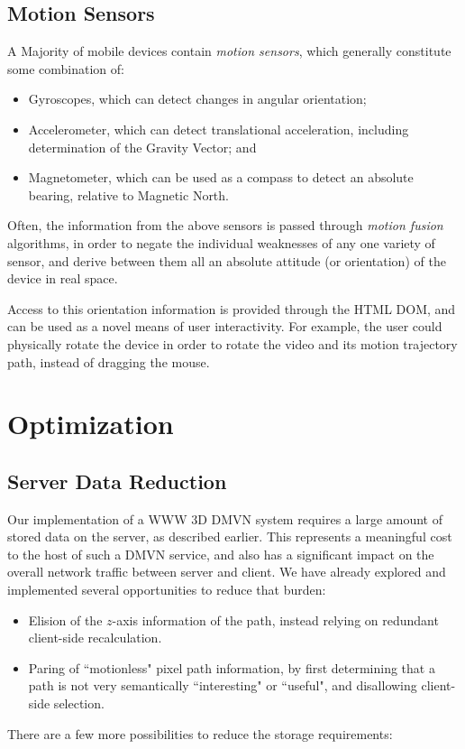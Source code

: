 \subsection{Motion Sensors}
A Majority of mobile devices contain \emph{motion sensors}, which generally constitute some combination of:
    \begin{itemize}
    \item Gyroscopes, which can detect changes in angular orientation;
    \item Accelerometer, which can detect translational acceleration, including determination of the Gravity Vector; and
    \item Magnetometer, which can be used as a compass to detect an absolute bearing, relative to Magnetic North.
    \end{itemize}
    Often, the information from the above sensors is passed through \emph{motion fusion} algorithms, in order to negate the individual weaknesses of any one variety of sensor, and derive between them all an absolute attitude (or orientation) of the device in real space.\par
    Access to this orientation information is provided through the HTML DOM, and can be used as a novel means of user interactivity. For example, the user could physically rotate the device in order to rotate the video and its motion trajectory path, instead of dragging the mouse.



\section{Optimization}

\subsection{Server Data Reduction}
    Our implementation of a WWW 3D DMVN system requires a large amount of stored data on the server, as described earlier. This represents a meaningful cost to the host of such a DMVN service, and also has a significant impact on the overall network traffic between server and client. We have already explored and implemented several opportunities to reduce that burden:
\begin {itemize}
    \item Elision of the $z$-axis information of the path, instead relying on redundant client-side recalculation.
    \item Paring of ``motionless" pixel path information, by first determining that a path is not very semantically ``interesting" or ``useful", and disallowing client-side selection.
\end {itemize}
There are a few more possibilities to reduce the storage requirements:

